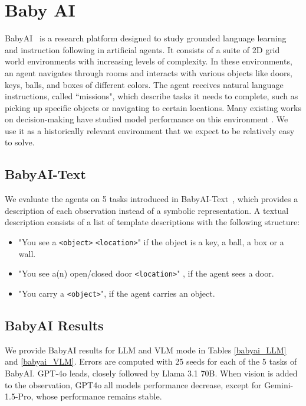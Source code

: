 \section{Baby AI}

\label{babyai}

BabyAI~\citep{babyai_iclr19} is a research platform designed to study grounded language learning and instruction following in artificial agents. It consists of a suite of 2D grid world environments with increasing levels of complexity. In these environments, an agent navigates through rooms and interacts with various objects like doors, keys, balls, and boxes of different colors. The agent receives natural language instructions, called ``missions", which describe tasks it needs to complete, such as picking up specific objects or navigating to certain locations. Many existing works on decision-making have studied model performance on this environment \citep{reed2022generalist, li2022pre}. We use it as a historically relevant environment that we expect to be relatively easy to solve. 

\subsection{BabyAI-Text}
We evaluate the agents on 5 tasks introduced in BabyAI-Text~\citep{carta2023grounding}, which provides a description of each observation instead of a symbolic representation. A textual description consists of a list of template descriptions with the following structure: 
\begin{itemize}
    \item "You see a \verb|<object>| \verb|<location>|" if the object is a key, a ball, a box or a wall.
    \item "You see a(n) open/closed door \verb|<location>|" , if the agent sees a door.
    \item "You carry a \verb|<object>|", if the agent carries an object.
\end{itemize}


\subsection{BabyAI Results}
We provide BabyAI results for LLM and VLM mode in Tables \ref{babyai_LLM} and \ref{babyai_VLM}. Errors are computed with 25 seeds for each of the 5 tasks of BabyAI. GPT-4o leads, closely followed by Llama 3.1 70B. When vision is added to the observation, GPT4o all models performance decrease, except for Gemini-1.5-Pro, whose performance remains stable.


